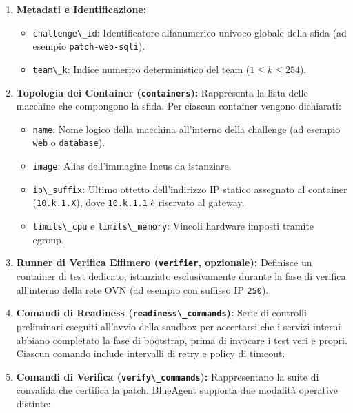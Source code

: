 \begin{enumerate}
\def\labelenumi{\arabic{enumi}.}
\item
  \textbf{Metadati e Identificazione:}

  \begin{itemize}
  \tightlist
  \item
    \passthrough{\lstinline!challenge\_id!}: Identificatore alfanumerico
    univoco globale della sfida (ad esempio
    \passthrough{\lstinline!patch-web-sqli!}).
  \item
    \passthrough{\lstinline!team\_k!}: Indice numerico deterministico
    del team (\(1 \le k \le 254\)).
  \end{itemize}
\item
  \textbf{Topologia dei Container
  (\passthrough{\lstinline!containers!}):} Rappresenta la lista delle
  macchine che compongono la sfida. Per ciascun container vengono
  dichiarati:

  \begin{itemize}
  \tightlist
  \item
    \passthrough{\lstinline!name!}: Nome logico della macchina
    all'interno della challenge (ad esempio
    \passthrough{\lstinline!web!} o \passthrough{\lstinline!database!}).
  \item
    \passthrough{\lstinline!image!}: Alias dell'immagine Incus da
    istanziare.
  \item
    \passthrough{\lstinline!ip\_suffix!}: Ultimo ottetto dell'indirizzo
    IP statico assegnato al container
    (\passthrough{\lstinline!10.k.1.X!}), dove
    \passthrough{\lstinline!10.k.1.1!} è riservato al gateway.
  \item
    \passthrough{\lstinline!limits\_cpu!} e
    \passthrough{\lstinline!limits\_memory!}: Vincoli hardware imposti
    tramite cgroup.
  \end{itemize}
\item
  \textbf{Runner di Verifica Effimero
  (\passthrough{\lstinline!verifier!}, opzionale):} Definisce un
  container di test dedicato, istanziato esclusivamente durante la fase
  di verifica all'interno della rete OVN (ad esempio con suffisso IP
  \passthrough{\lstinline!250!}).
\item
  \textbf{Comandi di Readiness
  (\passthrough{\lstinline!readiness\_commands!}):} Serie di controlli
  preliminari eseguiti all'avvio della sandbox per accertarsi che i
  servizi interni abbiano completato la fase di bootstrap, prima di
  invocare i test veri e propri. Ciascun comando include intervalli di
  retry e policy di timeout.
\item
  \textbf{Comandi di Verifica
  (\passthrough{\lstinline!verify\_commands!}):} Rappresentano la suite
  di convalida che certifica la patch. BlueAgent supporta due modalità
  operative distinte:


\end{enumerate}
